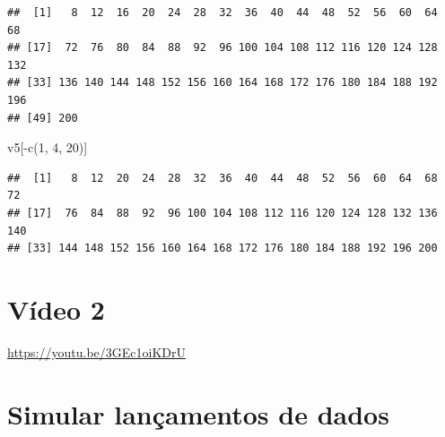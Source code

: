 \documentclass[
  11pt]{report}
\newenvironment{Shaded}{\begin{snugshade}}{\end{snugshade}}
\newcommand{\DecValTok}[1]{\textcolor[rgb]{0.00,0.00,0.81}{#1}}
\newcommand{\FunctionTok}[1]{\textcolor[rgb]{0.00,0.00,0.00}{#1}}
\newcommand{\NormalTok}[1]{#1}
\newcommand{\SpecialCharTok}[1]{\textcolor[rgb]{0.00,0.00,0.00}{#1}}
\renewenvironment{Shaded}{
    \begin{mdframed}[%
      roundcorner=2pt,%
      innerleftmargin=5pt,%
      innerrightmargin=5pt,%
      topline=true,%
      leftline=true,%
      rightline=true,%
      bottomline=true,%
      linewidth=0.5pt,%
      linecolor=black!20,%
      backgroundcolor=black!2,%
      skipabove=2ex,%
      skipbelow=2.5ex%
    ]%
  }
  {
    \end{mdframed}
  }
\begin{document}
\begin{itemize}
\begin{verbatim}
##  [1]   8  12  16  20  24  28  32  36  40  44  48  52  56  60  64  68
## [17]  72  76  80  84  88  92  96 100 104 108 112 116 120 124 128 132
## [33] 136 140 144 148 152 156 160 164 168 172 176 180 184 188 192 196
## [49] 200
\end{verbatim}

\begin{Shaded}
\begin{Highlighting}[]
\NormalTok{v5[}\SpecialCharTok{{-}}\FunctionTok{c}\NormalTok{(}\DecValTok{1}\NormalTok{, }\DecValTok{4}\NormalTok{, }\DecValTok{20}\NormalTok{)]}
\end{Highlighting}
\end{Shaded}

\begin{verbatim}
##  [1]   8  12  20  24  28  32  36  40  44  48  52  56  60  64  68  72
## [17]  76  84  88  92  96 100 104 108 112 116 120 124 128 132 136 140
## [33] 144 148 152 156 160 164 168 172 176 180 184 188 192 196 200
\end{verbatim}
\end{itemize}

\hypertarget{vuxeddeo-2}{%
\section{Vídeo 2}\label{vuxeddeo-2}}

\begin{center} \url{https://youtu.be/3GEc1oiKDrU} \end{center}

\hypertarget{simular-lanuxe7amentos-de-dados}{%
\section{Simular lançamentos de dados}\label{simular-lanuxe7amentos-de-dados}}
\end{document}
